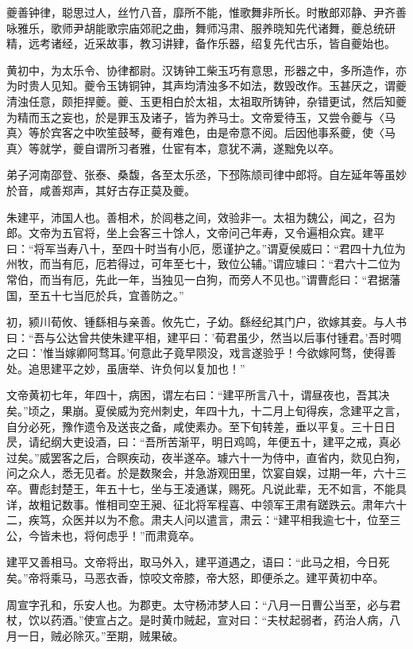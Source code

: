 \documentclass[12pt,UTF8]{ctexbook}
\begin{document}
夔善钟律，聪思过人，丝竹八音，靡所不能，惟歌舞非所长。时散郎邓静、尹齐善咏雅乐，歌师尹胡能歌宗庙郊祀之曲，舞师冯肃、服养晓知先代诸舞，夔总统研精，远考诸经，近采故事，教习讲肄，备作乐器，绍复先代古乐，皆自夔始也。

黄初中，为太乐令、协律都尉。汉铸钟工柴玉巧有意思，形器之中，多所造作，亦为时贵人见知。夔令玉铸铜钟，其声均清浊多不如法，数毁改作。玉甚厌之，谓夔清浊任意，颇拒捍夔。夔、玉更相白於太祖，太祖取所铸钟，杂错更试，然后知夔为精而玉之妄也，於是罪玉及诸子，皆为养马士。文帝爱待玉，又尝令夔与〈马真〉等於宾客之中吹笙鼓琴，夔有难色，由是帝意不阅。后因他事系夔，使〈马真〉等就学，夔自谓所习者雅，仕宦有本，意犹不满，遂黜免以卒。

弟子河南邵登、张泰、桑馥，各至太乐丞，下邳陈颃司律中郎将。自左延年等虽妙於音，咸善郑声，其好古存正莫及夔。

朱建平，沛国人也。善相术，於闾巷之间，效验非一。太祖为魏公，闻之，召为郎。文帝为五官将，坐上会客三十馀人，文帝问己年寿，又令遍相众宾。建平曰：“将军当寿八十，至四十时当有小厄，愿谨护之。”谓夏侯威曰：“君四十九位为州牧，而当有厄，厄若得过，可年至七十，致位公辅。”谓应璩曰：“君六十二位为常伯，而当有厄，先此一年，当独见一白狗，而旁人不见也。”谓曹彪曰：“君据藩国，至五十七当厄於兵，宜善防之。”

初，颍川荀攸、锺繇相与亲善。攸先亡，子幼。繇经纪其门户，欲嫁其妾。与人书曰：“吾与公达曾共使朱建平相，建平曰：'荀君虽少，然当以后事付锺君。'吾时啁之曰：'惟当嫁卿阿骛耳。'何意此子竟早陨没，戏言遂验乎！今欲嫁阿骛，使得善处。追思建平之妙，虽唐举、许负何以复加也！”

文帝黄初七年，年四十，病困，谓左右曰：“建平所言八十，谓昼夜也，吾其决矣。”顷之，果崩。夏侯威为兖州刺史，年四十九，十二月上旬得疾，念建平之言，自分必死，豫作遗令及送丧之备，咸使素办。至下旬转差，垂以平复。三十日日昃，请纪纲大吏设酒，曰：“吾所苦渐平，明日鸡鸣，年便五十，建平之戒，真必过矣。”威罢客之后，合瞑疾动，夜半遂卒。璩六十一为侍中，直省内，欻见白狗，问之众人，悉无见者。於是数聚会，并急游观田里，饮宴自娱，过期一年，六十三卒。曹彪封楚王，年五十七，坐与王凌通谋，赐死。凡说此辈，无不如言，不能具详，故粗记数事。惟相司空王昶、征北将军程喜、中领军王肃有蹉跌云。肃年六十二，疾笃，众医并以为不愈。肃夫人问以遣言，肃云：“建平相我逾七十，位至三公，今皆未也，将何虑乎！”而肃竟卒。

建平又善相马。文帝将出，取马外入，建平道遇之，语曰：“此马之相，今日死矣。”帝将乘马，马恶衣香，惊咬文帝膝，帝大怒，即便杀之。建平黄初中卒。

周宣字孔和，乐安人也。为郡吏。太守杨沛梦人曰：“八月一日曹公当至，必与君杖，饮以药酒。”使宣占之。是时黄巾贼起，宣对曰：“夫杖起弱者，药治人病，八月一日，贼必除灭。”至期，贼果破。
\end{document}
